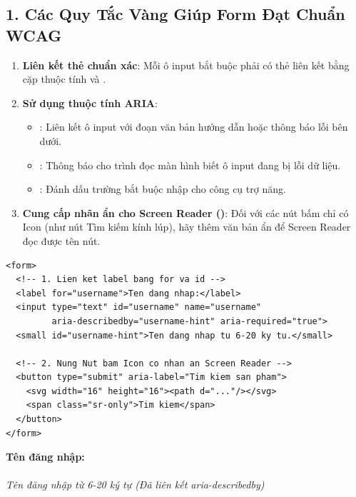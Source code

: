 \subsection{1. Các Quy Tắc Vàng Giúp Form Đạt Chuẩn WCAG}
\begin{enumerate}[leftmargin=1.5em, itemsep=4pt, parsep=0pt]
    \item \textbf{Liên kết thẻ  chuẩn xác}: Mỗi ô input bắt buộc phải có thẻ  liên kết bằng cặp thuộc tính  và .
    \item \textbf{Sử dụng thuộc tính ARIA}:
    \begin{itemize}[leftmargin=1.2em, itemsep=2pt]
        \item {}: Liên kết ô input với đoạn văn bản hướng dẫn hoặc thông báo lỗi bên dưới.
        \item {}: Thông báo cho trình đọc màn hình biết ô input đang bị lỗi dữ liệu.
        \item {}: Đánh dấu trường bắt buộc nhập cho công cụ trợ năng.
    \end{itemize}
    \item \textbf{Cung cấp nhãn ẩn cho Screen Reader ()}: Đối với các nút bấm chỉ có Icon (như nút Tìm kiếm kính lúp), hãy thêm văn bản ẩn để Screen Reader đọc được tên nút.
\end{enumerate}

\begin{codeWindow}
\begin{lstlisting}[language=HTML5]
<form>
  <!-- 1. Lien ket label bang for va id -->
  <label for="username">Ten dang nhap:</label>
  <input type="text" id="username" name="username" 
         aria-describedby="username-hint" aria-required="true">
  <small id="username-hint">Ten dang nhap tu 6-20 ky tu.</small>
  
  <!-- 2. Nung Nut bam Icon co nhan an Screen Reader -->
  <button type="submit" aria-label="Tim kiem san pham">
    <svg width="16" height="16"><path d="..."/></svg>
    <span class="sr-only">Tim kiem</span>
  </button>
</form>
\end{lstlisting}
\end{codeWindow}

\begin{browserWindow}
\sffamily\small
\textbf{Tên đăng nhập:}\\[2pt]
 \\[2pt]
\textcolor{gray!70}{\small\textit{Tên đăng nhập từ 6-20 ký tự (Đã liên kết aria-describedby)}}\\[8pt]
\end{browserWindow}

